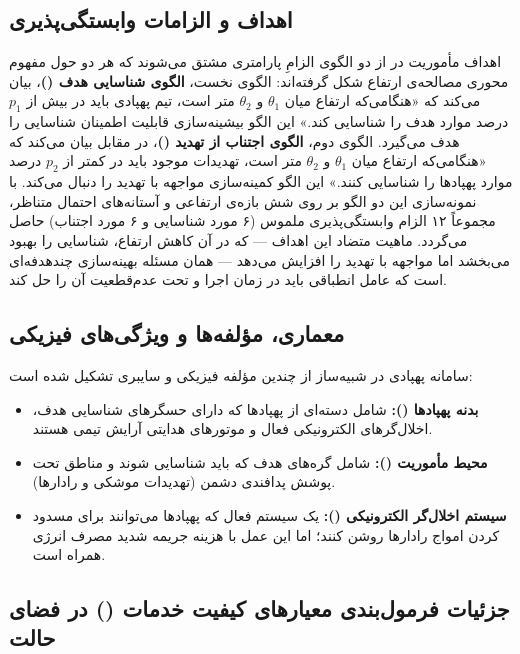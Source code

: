 \documentclass[oneside,openany,phd]{TMU-Thesis}
\begin{document}
\subsection{اهداف و الزامات وابستگی‌پذیری}
\label{subsec:dartsim_requirements}

اهداف مأموریت در  از دو الگوی الزامِ پارامتری مشتق می‌شوند که هر دو حول مفهوم محوری مصالحه‌ی ارتفاع شکل گرفته‌اند:
الگوی نخست، \textbf{الگوی شناسایی هدف ()}، بیان می‌کند که «هنگامی‌که ارتفاع میان $\theta_1$ و $\theta_2$ متر است، تیم پهپادی باید در بیش از $p_1$ درصد موارد هدف را شناسایی کند.» این الگو بیشینه‌سازی قابلیت اطمینان شناسایی را هدف می‌گیرد. الگوی دوم، \textbf{الگوی اجتناب از تهدید ()}، در مقابل بیان می‌کند که «هنگامی‌که ارتفاع میان $\theta_1$ و $\theta_2$ متر است، تهدیدات موجود باید در کمتر از $p_2$ درصد موارد پهپادها را شناسایی کنند.» این الگو کمینه‌سازی مواجهه با تهدید را دنبال می‌کند.
با نمونه‌سازی این دو الگو بر روی شش بازه‌ی ارتفاعی و آستانه‌های احتمال متناظر، مجموعاً ۱۲ الزام وابستگی‌پذیری ملموس (۶ مورد شناسایی و ۶ مورد اجتناب) حاصل می‌گردد. ماهیت متضاد این اهداف — که در آن کاهش ارتفاع، شناسایی را بهبود می‌بخشد اما مواجهه با تهدید را افزایش می‌دهد — همان مسئله بهینه‌سازی چندهدفه‌ای است که عامل انطباقی باید در زمان اجرا و تحت عدم‌قطعیت آن را حل کند.

\subsection{معماری، مؤلفه‌ها و ویژگی‌های فیزیکی}

سامانه پهپادی در شبیه‌ساز  از چندین مؤلفه فیزیکی و سایبری تشکیل شده است:
\begin{itemize}
    \item \textbf{بدنه پهپادها ():} شامل دسته‌ای از پهپادها که دارای حسگرهای شناسایی هدف، اخلال‌گرهای الکترونیکی فعال و موتورهای هدایتی آرایش تیمی هستند.
    \item \textbf{محیط مأموریت ():} شامل گره‌های هدف که باید شناسایی شوند و مناطق تحت پوشش پدافندی دشمن (تهدیدات موشکی و رادارها).
    \item \textbf{سیستم اخلال‌گر الکترونیکی ():} یک سیستم فعال که پهپادها می‌توانند برای مسدود کردن امواج رادارها روشن کنند؛ اما این عمل با هزینه جریمه شدید مصرف انرژی همراه است.
\end{itemize}

\subsection{جزئیات فرمول‌بندی معیارهای کیفیت خدمات () در فضای حالت}
\end{document}
